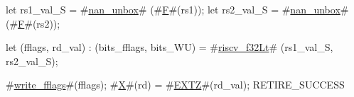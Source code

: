 let rs1_val_S = #\hyperref[sailRISCVznanzyunbox]{nan\_unbox}# (#\hyperref[sailRISCVzF]{F}#(rs1));
let rs2_val_S = #\hyperref[sailRISCVznanzyunbox]{nan\_unbox}# (#\hyperref[sailRISCVzF]{F}#(rs2));

let (fflags, rd_val) : (bits_fflags, bits_WU) =
    #\hyperref[sailRISCVzriscvzyf32Lt]{riscv\_f32Lt}# (rs1_val_S, rs2_val_S);

#\hyperref[sailRISCVzwritezyfflags]{write\_fflags}#(fflags);
#\hyperref[sailRISCVzX]{X}#(rd) = #\hyperref[sailRISCVzEXTZ]{EXTZ}#(rd_val);
RETIRE_SUCCESS
